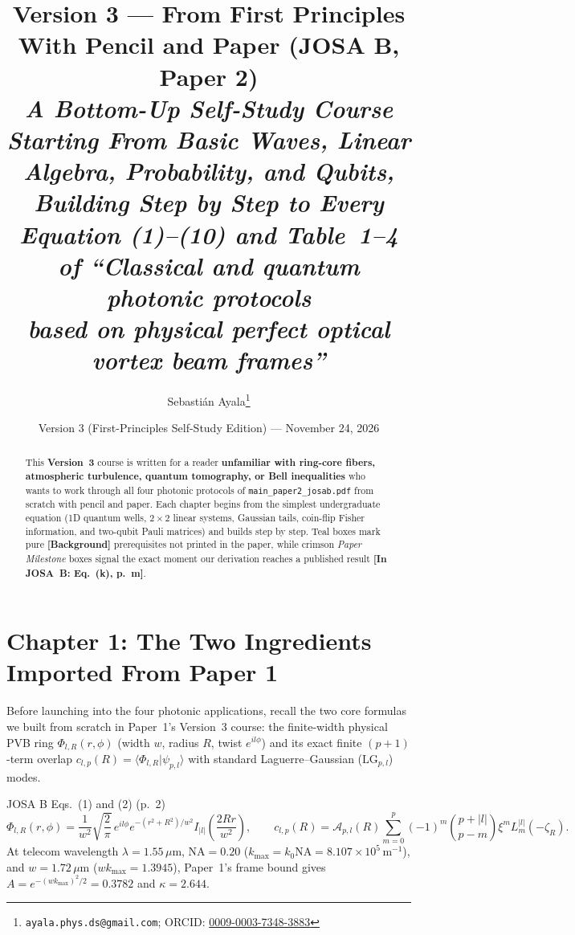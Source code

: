 \documentclass[10pt,letterpaper]{article}
\title{\vspace{-1.0cm}\textbf{\Large Version 3 --- From First Principles With Pencil and Paper (JOSA B, Paper 2)}\\[0.35em]
\large\textit{A Bottom-Up Self-Study Course Starting From Basic Waves, Linear Algebra, Probability, and Qubits,\\
Building Step by Step to Every Equation (1)--(10) and Table~1--4 of ``Classical and quantum photonic protocols\\
based on physical perfect optical vortex beam frames''}}
\author{Sebasti\'an Ayala\thanks{\texttt{ayala.phys.ds@gmail.com}; ORCID: \href{https://orcid.org/0009-0003-7348-3883}{0009-0003-7348-3883}}}
\date{Version 3 (First-Principles Self-Study Edition) --- November 24, 2026}
\newcommand{\braket}[2]{\langle #1 | #2 \rangle}
\newcommand{\abs}[1]{\lvert #1 \rvert}
\newcommand{\inpaper}[1]{\textcolor{crimsonborder}{\textbf{[In JOSA~B: #1]}}}
\newcommand{\bgtag}{\textcolor{tealborder}{\textbf{[Background]}}}
\numberwithin{equation}{section}
\begin{document}
\maketitle
\thispagestyle{plain}

\begin{abstract}
\noindent This \textbf{Version~3} course is written for a reader \textbf{unfamiliar with ring-core fibers, atmospheric turbulence, quantum tomography, or Bell inequalities} who wants to work through all four photonic protocols of \texttt{main\_paper2\_josab.pdf} from scratch with pencil and paper. Each chapter begins from the simplest undergraduate equation (1D quantum wells, $2\times 2$ linear systems, Gaussian tails, coin-flip Fisher information, and two-qubit Pauli matrices) and builds step by step. Teal boxes mark pure \bgtag{} prerequisites not printed in the paper, while crimson \emph{Paper Milestone} boxes signal the exact moment our derivation reaches a published result \inpaper{Eq.~(k), p.~m}.
\end{abstract}

\tableofcontents
\vspace{0.5em}

\section{Chapter 1: The Two Ingredients Imported From Paper 1}
\label{sec:b_c1}

Before launching into the four photonic applications, recall the two core formulas we built from scratch in Paper~1's Version~3 course: the finite-width physical PVB ring $\Phi_{l,R}(r,\phi)$ (width $w$, radius $R$, twist $e^{il\phi}$) and its exact finite $(p+1)$-term overlap $c_{l,p}(R) = \braket{\Phi_{l,R}}{\psi_{p,l}}$ with standard Laguerre--Gaussian ($\mathrm{LG}_{p,l}$) modes.

\begin{paperhit}{JOSA B Eqs.~(1) and (2) (p.~2)}
\[
  \Phi_{l,R}(r,\phi) = \frac{1}{w^2}\sqrt{\frac{2}{\pi}}\,e^{il\phi}e^{-(r^2+R^2)/w^2} I_{\abs{l}}\!\left(\frac{2Rr}{w^2}\right), \qquad
  c_{l,p}(R) = \mathcal{A}_{p,l}(R)\sum_{m=0}^p (-1)^m\binom{p+\abs{l}}{p-m}\xi^m L_m^{\abs{l}}(-\zeta_R).
\]
At telecom wavelength $\lambda = 1.55\,\mu\mathrm{m}$, $\mathrm{NA} = 0.20$ ($k_{\max} = k_0\mathrm{NA} = 8.107\times 10^5\,\mathrm{m}^{-1}$), and $w = 1.72\,\mu\mathrm{m}$ ($wk_{\max} = 1.3945$), Paper~1's frame bound gives $A = e^{-(wk_{\max})^2/2} = \mathbf{0.3782}$ and $\kappa = \mathbf{2.644}$.
\end{paperhit}
\end{document}
